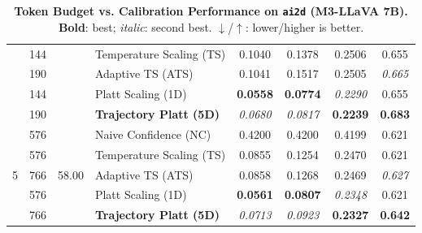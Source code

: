 \begin{table}[t]
\begin{tabular}{ccclcccc}
 & 144 &  & Temperature Scaling (TS) & 0.1040 & 0.1378 & 0.2506 & 0.655 \\
 & 190 &  & Adaptive TS (ATS) & 0.1041 & 0.1517 & 0.2505 & \textit{0.665} \\
 & 144 &  & Platt Scaling (1D) & \textbf{0.0558} & \textbf{0.0774} & \textit{0.2290} & 0.655 \\
 & 190 &  & \textbf{Trajectory Platt (5D)} & \textit{0.0680} & \textit{0.0817} & \textbf{0.2239} & \textbf{0.683} \\
\midrule
\multirow{5}{*}{5} & 576 & \multirow{5}{*}{58.00} & Naive Confidence (NC) & 0.4200 & 0.4200 & 0.4199 & 0.621 \\
 & 576 &  & Temperature Scaling (TS) & 0.0855 & 0.1254 & 0.2470 & 0.621 \\
 & 766 &  & Adaptive TS (ATS) & 0.0858 & 0.1268 & 0.2469 & \textit{0.627} \\
 & 576 &  & Platt Scaling (1D) & \textbf{0.0561} & \textbf{0.0807} & \textit{0.2348} & 0.621 \\
 & 766 &  & \textbf{Trajectory Platt (5D)} & \textit{0.0713} & \textit{0.0923} & \textbf{0.2327} & \textbf{0.642} \\
\bottomrule
\end{tabular}
\caption{\textbf{Token Budget vs. Calibration Performance on \texttt{ai2d} (M3-LLaVA 7B).} \textbf{Bold}: best; \textit{italic}: second best. $\downarrow$/$\uparrow$: lower/higher is better.}
\label{tab:token_budget_ai2d_m3}
\end{table}

